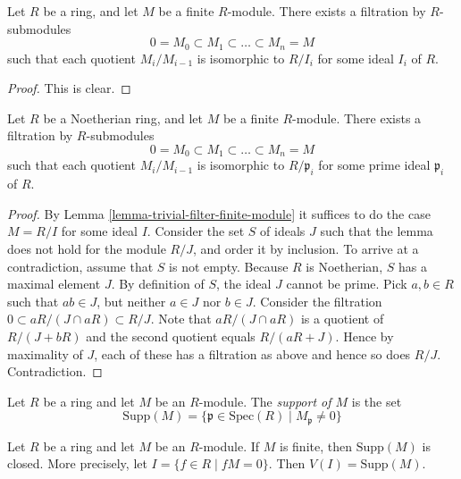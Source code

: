 \begin{lemma}
\label{lemma-trivial-filter-finite-module}
Let $R$ be a ring, and let $M$ be a finite $R$-module.
There exists a filtration by $R$-submodules
$$
0 = M_0 \subset M_1 \subset \ldots \subset M_n = M
$$
such that each quotient $M_i/M_{i-1}$ is isomorphic
to $R/I_i$ for some ideal $I_i$ of $R$.
\end{lemma}

\begin{proof}
This is clear.
\end{proof}

\begin{lemma}
\label{lemma-filter-Noetherian-module}
Let $R$ be a Noetherian ring, and let $M$ be a finite $R$-module.
There exists a filtration by $R$-submodules
$$
0 = M_0 \subset M_1 \subset \ldots \subset M_n = M
$$
such that each quotient $M_i/M_{i-1}$ is isomorphic
to $R/\mathfrak p_i$ for some prime ideal $\mathfrak p_i$
of $R$.
\end{lemma}

\begin{proof}
By Lemma \ref{lemma-trivial-filter-finite-module}
it suffices to do the case $M = R/I$ for some ideal $I$.
Consider the set $S$ of ideals $J$ such that the lemma
does not hold for the module $R/J$, and order it by
inclusion. To arrive at a
contradiction, assume that $S$ is not empty. Because
$R$ is Noetherian, $S$ has a maximal element $J$.
By definition of $S$, the ideal $J$ cannot be prime.
Pick $a, b\in R$ such that $ab \in J$, but neither
$a \in J$ nor $b\in J$. Consider the filtration
$0 \subset aR/(J \cap aR) \subset R/J$.
Note that $aR/(J \cap aR)$ is a quotient of $R/(J + bR)$
and the second quotient equals $R/(aR + J)$. Hence by
maximality of $J$, each of these has a filtration as
above and hence so does $R/J$. Contradiction.
\end{proof}

\begin{definition}
\label{definition-support-module}
Let $R$ be a ring and let $M$ be an $R$-module.
The {\it support of $M$} is the set
$$
\text{Supp}(M)
=
\{
\mathfrak p \in \text{Spec}(R)
\mid
M_{\mathfrak p} \not= 0
\}
$$
\end{definition}

\begin{lemma}
\label{lemma-support-closed}
Let $R$ be a ring and let $M$ be an $R$-module.
If $M$ is finite, then $\text{Supp}(M)$ is closed.
More precisely, let $I = \{f \in R \mid fM = 0\}$.
Then $V(I) = \text{Supp}(M)$.
\end{lemma}


